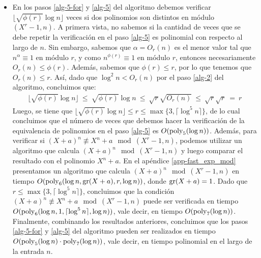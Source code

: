\documentclass[10pt]{article}
\newcommand{\0}{\mathbf{0}}
\newcommand{\1}{\mathbf{1}}
\newcommand{\modulo}{\mod(X^r-1,n)}
\newcommand{\poly}{{\rm poly}}
\newcommand{\+}{\oplus}
\newcommand{\comentario}[1]{}
\theoremstyle{remark}
\theoremstyle{remark}
\newcommand{\grado}{{\rm gr}}
\begin{document}
\begin{itemize}
	
	\item En los pasos \ref{alg-5-for} y \ref{alg-5} del algoritmo debemos verificar $\lfloor \sqrt{\phi(r)} \log n\rfloor$ veces si dos polinomios son distintos en módulo $(X^r-1,n)$. A primera vista, no sabemos si la cantidad de veces que se debe repetir la verificación en el paso \ref{alg-5}
	es polinomial con respecto al largo de $n$. Sin embargo, sabemos que $\alpha = O_r(n)$ es el menor valor tal que $n^{\alpha}\equiv 1$ en módulo $r$, y como $n^{\phi(r)}\equiv 1$ en módulo $r$, entonces necesariamente $O_r(n)\leq \phi(r)$. Además, sabemos que $\phi(r)\leq r$, por lo que tenemos que $O_r(n)\leq r$. Así, dado que $\log^2 n < O_r(n)$ por el paso \ref{alg-2} del algoritmo, concluimos que:
	\begin{eqnarray}\label{cota-ell}
		\lfloor \sqrt{\phi(r)} \log n\rfloor \ \leq \ \sqrt{\phi(r)} \log n
		\ \leq \ \sqrt{r}\sqrt{O_r(n)} \ \leq \ \sqrt{r}\sqrt{r}
		\ = \ r
	\end{eqnarray}
	Luego, se tiene que $\lfloor \sqrt{\phi(r)} \log n\rfloor\leq r \leq  \max\{3,\lceil \log ^5 n\rceil\}$, de lo cual concluimos que el número de veces que debemos hacer la verificación de la equivalencia de polinomios en el paso \ref{alg-5} es $O(\poly_5(\log n))$. Además, para verificar si $(X+a)^n \not\equiv X^n+a \modulo$, podemos utilizar un algoritmo que calcula $(X+a)^n \!\! \modulo$ y luego comparar el resultado con el polinomio $X^n+a$. En el apéndice \ref{app-fast_exp_mod} presentamos un algoritmo que calcula $(X+a)^n \!\! \modulo$ en tiempo $O(\poly_6(\log n, \grado(X+a), r, \log n))$, donde $\grado(X+a) = 1$.
        Dado que $r \leq  \max\{3,\lceil \log ^5 n\rceil\}$, concluimos que la condición $(X+a)^n \not\equiv X^n+a \modulo$ puede ser verificada en tiempo $O(\poly_6(\log n, 1, \lceil \log ^5 n\rceil, \log n))$, vale decir, en tiempo $O(\poly_7(\log n))$. Finalmente, combinando los resultados anteriores, concluimos que los pasos \ref{alg-5-for} y \ref{alg-5} del algoritmo pueden ser realizados en tiempo $O(\poly_5(\log n) \cdot \poly_7(\log n))$, vale decir, en tiempo polinomial en el largo de la entrada $n$.
	\end{itemize}
		
\end{document}
